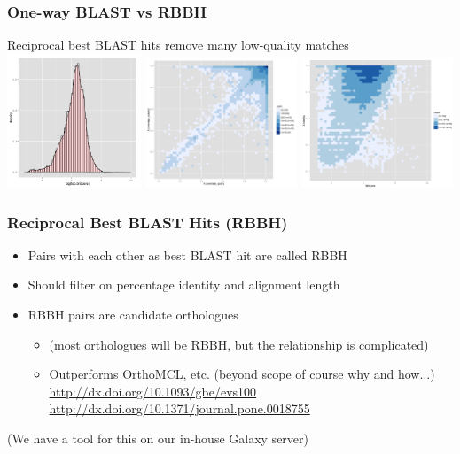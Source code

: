 \begin{frame}
  \frametitle{One-way BLAST vs RBBH}   
  Reciprocal best BLAST hits remove many low-quality matches \\
  \includegraphics[width=0.3\textwidth]{images/rbbh4}
  \includegraphics[width=0.34\textwidth]{images/rbbh5}
  \includegraphics[width=0.34\textwidth]{images/rbbh6}
\end{frame}

\begin{frame}
  \frametitle{Reciprocal Best BLAST Hits (RBBH)}
  \begin{itemize}
    \item Pairs with each other as best BLAST hit are called RBBH
    \item Should filter on percentage identity and alignment length
    \item RBBH pairs are candidate orthologues
    \begin{itemize}
      \item (most orthologues will be RBBH, but the relationship is complicated)
      \item Outperforms OrthoMCL, etc. (beyond scope of course why and how$\ldots$) \\
           \url{http://dx.doi.org/10.1093/gbe/evs100} \\
           \url{http://dx.doi.org/10.1371/journal.pone.0018755}
    \end{itemize}
  \end{itemize}
  (We have a tool for this on our in-house Galaxy server)
\end{frame}

